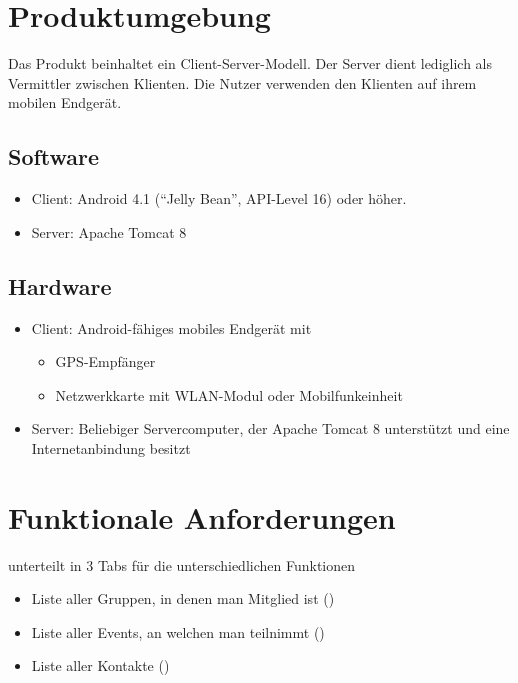 \documentclass[parskip=full,11pt]{scrartcl}
\begin{document}
\section{Produktumgebung}
Das Produkt beinhaltet ein Client-Server-Modell.
Der Server dient lediglich als Vermittler zwischen Klienten.
Die Nutzer verwenden den Klienten auf ihrem mobilen Endgerät.
\subsection{Software}
\begin{itemize}
    \item Client: Android 4.1 (\enquote{Jelly Bean}, API-Level 16) oder
        höher.
    \item Server: Apache Tomcat 8
\end{itemize}

\subsection{Hardware}
\begin{itemize}
    \item Client: Android-fähiges mobiles Endgerät mit
        \begin{itemize}
            \item GPS-Empfänger
            \item Netzwerkkarte mit WLAN-Modul oder Mobilfunkeinheit
        \end{itemize}
    \item Server: Beliebiger Servercomputer, der Apache Tomcat 8 unterstützt
        und eine Internetanbindung besitzt
\end{itemize}

\section{Funktionale Anforderungen}

unterteilt in 3 Tabs für die unterschiedlichen Funktionen
\begin{itemize}
    \item Liste aller Gruppen, in denen man Mitglied ist ()
    \item Liste aller Events, an welchen man teilnimmt ()
    \item Liste aller Kontakte ()
\end{itemize}
\end{document}
